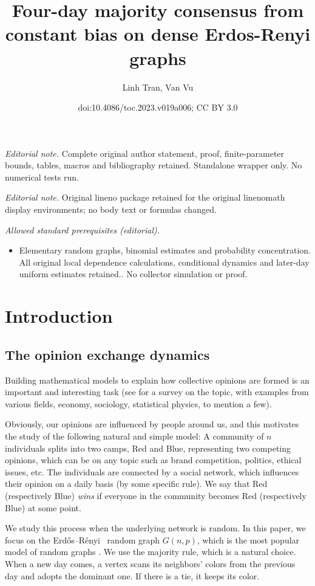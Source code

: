 \documentclass[11pt]{article}
\title{Four-day majority consensus from constant bias on dense Erdos-Renyi graphs}
\author{Linh Tran, Van Vu}
\date{doi:10.4086/toc.2023.v019a006; CC BY 3.0}
\numberwithin{equation}{section}
\theoremstyle{definition}
\theoremstyle{plain}
\newcommand{\err}{Erd\H{o}s--R{\'e}nyi}
\begin{document}
\maketitle
\noindent\textit{Editorial note.} Complete original author statement, proof, finite-parameter bounds, tables, macros and bibliography retained. Standalone wrapper only. No numerical tests run.\par\medskip
\noindent\textit{Editorial note.} Original lineno package retained for the original linenomath display environments; no body text or formulas changed.\par\medskip
\noindent\textit{Allowed standard prerequisites (editorial).}\begin{itemize}
\item Elementary random graphs, binomial estimates and probability concentration. All original local dependence calculations, conditional dynamics and later-day uniform estimates retained.. No collector simulation or proof.
\end{itemize}\medskip
			\section {Introduction} \label{sec:introduction}
			
			
			\subsection {The opinion exchange  dynamics}
			
			Building mathematical models to explain how collective opinions are formed is an important and interesting task (see \cite{mossel2017} for a survey on the topic, with examples from  various fields, economy, sociology, statistical physics, to mention a few).
			
			Obviously, our opinions are influenced by people around us, and this motivates the study of the following natural and simple model:
			A community of $n$ individuals splits into two camps,  Red and Blue, representing two competing opinions, which can be on any topic such as brand competition, politics, ethical issues, etc. The individuals are connected by a social network, which influences  their opinion on a daily basis (by some specific rule). We say that Red (respectively Blue) \emph{wins} if everyone in the community becomes Red (respectively Blue) at some point.
			
			
			We study  this process  when the underlying network is random. In this paper, we focus on the %
			\err\   %
			random graph $G(n, p)$, which is the most popular model of random graphs  \cite{Bollobasbook, Jansonbook}. We use the majority rule, which is a natural choice. When a new day comes, a vertex scans its neighbors' colors %
			from  %
			the previous day and adopts the dominant one. If there is a tie, it keeps its color.
			
\end{document}
